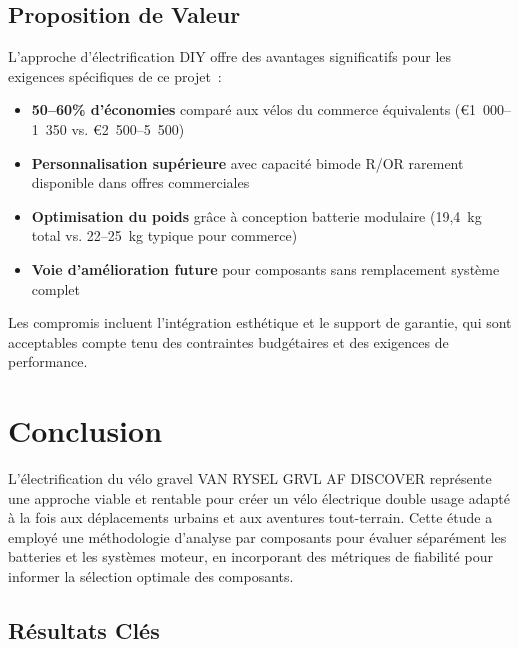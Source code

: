 \documentclass[12pt,a4paper]{article}
\begin{document}
\subsection{Proposition de Valeur}

L'approche d'électrification DIY offre des avantages significatifs pour les exigences spécifiques de ce projet~:
\begin{itemize}
    \item \textbf{50--60\% d'économies} comparé aux vélos du commerce équivalents (€1~000--1~350 vs. €2~500--5~500)
    \item \textbf{Personnalisation supérieure} avec capacité bimode R/OR rarement disponible dans offres commerciales
    \item \textbf{Optimisation du poids} grâce à conception batterie modulaire (19,4~kg total vs. 22--25~kg typique pour commerce)
    \item \textbf{Voie d'amélioration future} pour composants sans remplacement système complet
\end{itemize}

Les compromis incluent l'intégration esthétique et le support de garantie, qui sont acceptables compte tenu des contraintes budgétaires et des exigences de performance.

\section{Conclusion}

L'électrification du vélo gravel VAN RYSEL GRVL AF DISCOVER représente une approche viable et rentable pour créer un vélo électrique double usage adapté à la fois aux déplacements urbains et aux aventures tout-terrain. Cette étude a employé une méthodologie d'analyse par composants pour évaluer séparément les batteries et les systèmes moteur, en incorporant des métriques de fiabilité pour informer la sélection optimale des composants.

\subsection{Résultats Clés}
\end{document}

